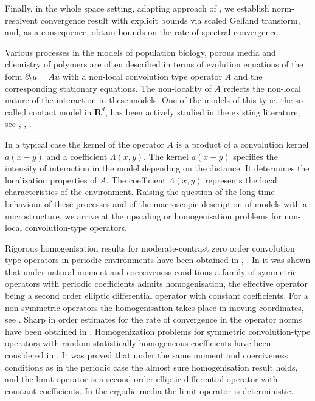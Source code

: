 \documentclass[11pt]{article}
\newcommand{\R}{\mathbf{R}}
\newcounter{bei}
\theoremstyle{remark}
\begin{document}
Finally, in the whole space setting, adapting approach of \cite{CKS2023}, we establish norm-resolvent convergence result with explicit bounds via scaled Gelfand transform, and, as a consequence, obtain bounds on the rate of spectral convergence.

Various processes in the models of population biology, porous media and chemistry of polymers
are often described in terms of evolution equations of the form $\partial_t u=A u$ with a non-local convolution type operator $A$ and the corresponding stationary equations. The non-locality of $A$ reflects the  non-local nature of the interaction in these models.
One of the models of this type, the so-called contact model in $\R^d$,  has been actively studied in the existing literature, see \cite{KoKuPir2008}, \cite{KMPZ2017}, \cite{KoPirZh2016}.

In a typical case the kernel of the operator $A$ is a product of a convolution kernel
$a(x-y)$ and a coefficient $\Lambda(x,y)$.  The kernel $a(x-y)$  specifies the intensity of interaction in the model depending on the distance. It determines the localization properties of $A$. The coefficient $\Lambda(x,y)$ represents
the local characteristics of the environment.
Raising the question of the long-time behaviour of these processes and of the macroscopic description of models with
a microstructure, we arrive at the upscaling or homogenisation problems for non-local convolution-type operators.


Rigorous homogenisation results for moderate-contrast zero order convolution type operators in periodic
environments have been obtained in
\cite{PiZhiz2017}, \cite{PiZhiz2019}. In \cite{PiZhiz2017} it was shown that under natural moment and
coerciveness conditions a family of symmetric operators with periodic coefficients admits homogenisation, the effective
operator being a second order elliptic differential operator with constant coefficients. For a non-symmetric operators
the homogenisation takes place in moving coordinates, see \cite{PiZhiz2019}.
Sharp in order estimates for the rate of convergence in the operator norms have been obtained in \cite{PSSZ2023}.
Homogenization problems for symmetric convolution-type operators with random statistically homogeneous coefficients have been considered in \cite{PiZhiz2020}. It was proved that under the same moment and coerciveness conditions as in the
periodic case  the almost sure homogenisation result holds, and the limit operator is a second order elliptic differential
operator with constant coefficients. In the ergodic media the limit operator is deterministic.
\end{document}
